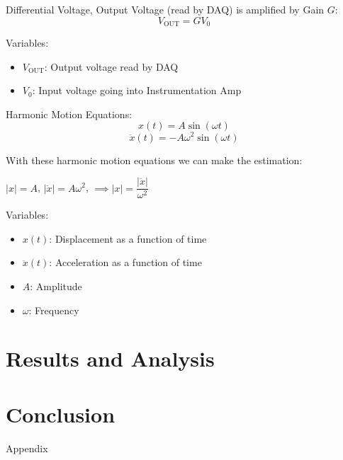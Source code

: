 \documentclass{article}
\begin{document}
Differential Voltage, Output Voltage (read by DAQ) is amplified by Gain $G$:
\begin{equation}
    V_{\text{OUT}} = GV_{0}
\end{equation}

Variables:
\begin{itemize}
    \item \(V_{\text{OUT}}\): Output voltage read by DAQ
    \item \(V_{0}\): Input voltage going into Instrumentation Amp
\end{itemize}
\vspace{5mm}

Harmonic Motion Equations:
\begin{equation}
    x(t) = A\sin{(\omega t)}
\end{equation}
\begin{equation}
    \ddot{x}(t) = -A\omega^{2} \sin{(\omega t)}
\end{equation}

With these harmonic motion equations we can make the estimation:
\begin{center}
    \(|x| = A\), \hspace{10mm} \(|\ddot{x}| = A\omega^{2}\), \hspace{10mm} \(\implies |x| = \dfrac{|\ddot{x}|}{\omega^{2}}\)
\end{center}

Variables:
\begin{itemize}
    \item \(x(t)\): Displacement as a function of time
    \item \(\ddot{x}(t)\): Acceleration as a function of time
    \item \(A\): Amplitude
    \item \(\omega\): Frequency
\end{itemize}
\vspace{5mm}

    
\section{Results and Analysis}

 
\section{Conclusion}



\newpage
\thispagestyle{empty}  %
\begin{center}
	\vspace*{\fill}
	{\Huge Appendix}
	\vspace*{\fill}
\end{center}
\end{document}
